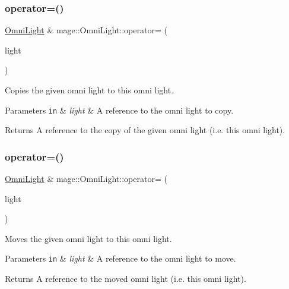 \subsubsection{\texorpdfstring{operator=()}{operator=()}\hspace{0.1cm}{\footnotesize\ttfamily [1/2]}}
{\footnotesize\ttfamily \hyperlink{classmage_1_1_omni_light}{Omni\+Light} \& mage\+::\+Omni\+Light\+::operator= (\begin{DoxyParamCaption}\item[{const \hyperlink{classmage_1_1_omni_light}{Omni\+Light} \&}]{light }\end{DoxyParamCaption})\hspace{0.3cm}{\ttfamily [default]}}

Copies the given omni light to this omni light.


\begin{DoxyParams}[1]{Parameters}
\mbox{\tt in}  & {\em light} & A reference to the omni light to copy. \\
\hline
\end{DoxyParams}
\begin{DoxyReturn}{Returns}
A reference to the copy of the given omni light (i.\+e. this omni light). 
\end{DoxyReturn}
\hypertarget{classmage_1_1_omni_light_a287a54dede61e65efe4493ec20531428}{}\label{classmage_1_1_omni_light_a287a54dede61e65efe4493ec20531428} 
\subsubsection{\texorpdfstring{operator=()}{operator=()}\hspace{0.1cm}{\footnotesize\ttfamily [2/2]}}
{\footnotesize\ttfamily \hyperlink{classmage_1_1_omni_light}{Omni\+Light} \& mage\+::\+Omni\+Light\+::operator= (\begin{DoxyParamCaption}\item[{\hyperlink{classmage_1_1_omni_light}{Omni\+Light} \&\&}]{light }\end{DoxyParamCaption})\hspace{0.3cm}{\ttfamily [default]}}

Moves the given omni light to this omni light.


\begin{DoxyParams}[1]{Parameters}
\mbox{\tt in}  & {\em light} & A reference to the omni light to move. \\
\hline
\end{DoxyParams}
\begin{DoxyReturn}{Returns}
A reference to the moved omni light (i.\+e. this omni light). 
\end{DoxyReturn}
\hypertarget{classmage_1_1_omni_light_ad46e519eae108d009c8b77b86d302ed1}{}\label{classmage_1_1_omni_light_ad46e519eae108d009c8b77b86d302ed1} 
